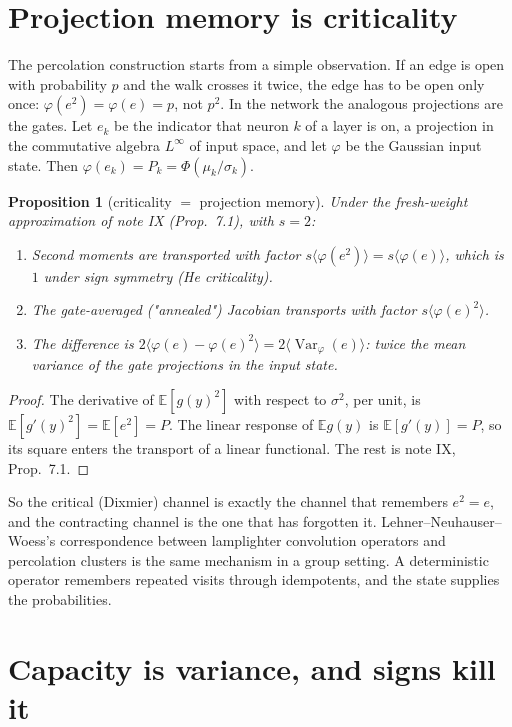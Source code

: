 \documentclass[11pt]{article}
\newtheorem{proposition}[theorem]{Proposition}
\theoremstyle{definition}
\theoremstyle{remark}
\newcommand{\E}{\mathbb E}
\newcommand{\Var}{\operatorname{Var}}
\begin{document}
\section{Projection memory is criticality}\label{sec:proj}

The percolation construction starts from a simple observation. If an edge is open with probability $p$ and the walk crosses it twice, the edge has to be open only once: $\varphi(e^2)=\varphi(e)=p$, not $p^2$. In the network the analogous projections are the gates. Let $e_k$ be the indicator that neuron $k$ of a layer is on, a projection in the commutative algebra $L^\infty$ of input space, and let $\varphi$ be the Gaussian input state. Then $\varphi(e_k)=P_k=\Phi(\mu_k/\sigma_k)$.

\begin{proposition}[criticality $=$ projection memory]\label{prop:proj}
Under the fresh-weight approximation of note IX (Prop.~7.1), with $s=2$:
\begin{enumerate}
\item Second moments are transported with factor $s\langle\varphi(e^2)\rangle=s\langle\varphi(e)\rangle$, which is $1$ under sign symmetry (He criticality).
\item The gate-averaged ("annealed") Jacobian transports with factor $s\langle\varphi(e)^2\rangle$.
\item The difference is $2\langle\varphi(e)-\varphi(e)^2\rangle=2\langle\Var_\varphi(e)\rangle$: twice the mean variance of the gate projections in the input state.
\end{enumerate}
\end{proposition}

\begin{proof}
The derivative of $\E[g(y)^2]$ with respect to $\sigma^2$, per unit, is $\E[g'(y)^2]=\E[e^2]=P$. The linear response of $\E g(y)$ is $\E[g'(y)]=P$, so its square enters the transport of a linear functional. The rest is note IX, Prop.~7.1.
\end{proof}

\noindent So the critical (Dixmier) channel is exactly the channel that remembers $e^2=e$, and the contracting channel is the one that has forgotten it. Lehner--Neuhauser--Woess's correspondence between lamplighter convolution operators and percolation clusters is the same mechanism in a group setting. A deterministic operator remembers repeated visits through idempotents, and the state supplies the probabilities.

\section{Capacity is variance, and signs kill it}\label{sec:capacity}
\end{document}
